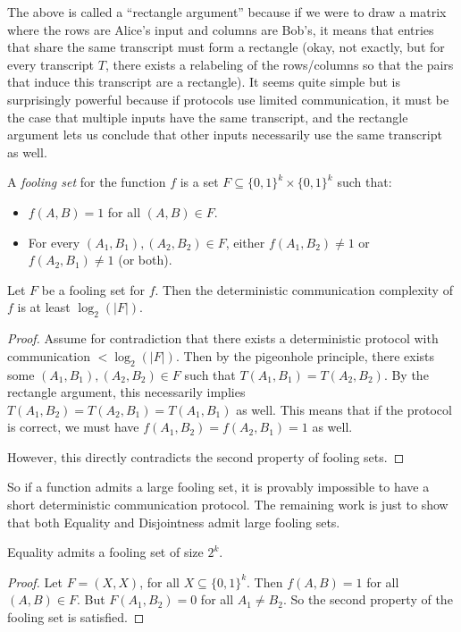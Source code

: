 The above is called a ``rectangle argument'' because if we were to draw a matrix where the rows are Alice's input and columns are Bob's, it means that entries that share the same transcript must form a rectangle (okay, not exactly, but for every transcript $T$, there exists a relabeling of the rows/columns so that the pairs that induce this transcript are a rectangle). It seems quite simple but is surprisingly powerful because if protocols use limited communication, it must be the case that multiple inputs have the same transcript, and the rectangle argument lets us conclude that other inputs necessarily use the same transcript as well. 

\begin{definition}
A \emph{fooling set} for the function $f$ is a set $F \subseteq \{0,1\}^k \times \{0,1\}^k$ such that:
\begin{itemize}
\item $f(A, B) = 1$ for all $(A, B) \in F$.
\item For every $(A_1, B_1), (A_2, B_2) \in F$, either $f(A_1, B_2) \neq 1$ or $f(A_2, B_1) \neq 1$ (or both). 
\end{itemize}
\end{definition}

\begin{proposition}Let $F$ be a fooling set for $f$. Then the deterministic communication complexity of $f$ is at least $\log_2(|F|)$.
\end{proposition}
\begin{proof}
Assume for contradiction that there exists a deterministic protocol with communication $< \log_2(|F|)$. Then by the pigeonhole principle, there exists some $(A_1, B_1), (A_2, B_2) \in F$ such that $T(A_1, B_1) = T(A_2, B_2)$. By the rectangle argument, this necessarily implies $T(A_1, B_2) = T(A_2, B_1) = T(A_1, B_1)$ as well. This means that if the protocol is correct, we must have $f(A_1, B_2) = f(A_2, B_1) = 1$ as well.

However, this directly contradicts the second property of fooling sets.
\end{proof}

So if a function admits a large fooling set, it is provably impossible to have a short deterministic communication protocol. The remaining work is just to show that both Equality and Disjointness admit large fooling sets.

\begin{proposition} Equality admits a fooling set of size $2^k$. 

\end{proposition}
\begin{proof}
Let $F = (X, X)$, for all $X \subseteq \{0,1\}^k$. Then $f(A, B) = 1$ for all $(A, B) \in F$. But $F(A_1, B_2) = 0$ for all $A_1 \neq B_2$. So the second property of the fooling set is satisfied. 
\end{proof}


